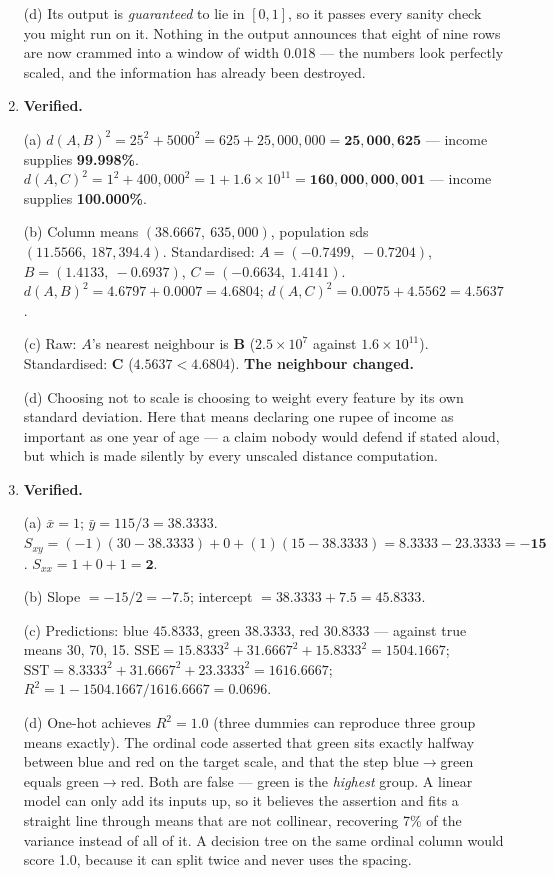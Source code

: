 \documentclass[11pt,a4paper]{article}
\newcommand{\A}[1]{\item[\textbf{#1}]}
\begin{document}
\begin{enumerate}[leftmargin=1.9cm]
\begin{answerbox}
(d) Its output is \emph{guaranteed} to lie in $[0,1]$, so it passes every sanity
check you might run on it. Nothing in the output announces that eight of nine
rows are now crammed into a window of width 0.018 --- the numbers look
perfectly scaled, and the information has already been destroyed.
\end{answerbox}

\A{U4.64} \textbf{Verified.}
\begin{answerbox}
(a) $d(A,B)^2 = 25^2 + 5000^2 = 625 + 25{,}000{,}000 = \mathbf{25{,}000{,}625}$
--- income supplies \textbf{99.998\%}.
$d(A,C)^2 = 1^2 + 400{,}000^2 = 1 + 1.6\times10^{11} =
\mathbf{160{,}000{,}000{,}001}$ --- income supplies \textbf{100.000\%}.

(b) Column means $(38.6667,\ 635{,}000)$, population sds
$(11.5566,\ 187{,}394.4)$. Standardised:
$A = (-0.7499,\ -0.7204)$, $B = (1.4133,\ -0.6937)$, $C = (-0.6634,\ 1.4141)$.
$d(A,B)^2 = 4.6797 + 0.0007 = \mathbf{4.6804}$;
$d(A,C)^2 = 0.0075 + 4.5562 = \mathbf{4.5637}$.

(c) Raw: $A$'s nearest neighbour is $\mathbf{B}$ ($2.5\times10^7$ against
$1.6\times10^{11}$). Standardised: $\mathbf{C}$ ($4.5637 < 4.6804$).
\textbf{The neighbour changed.}

(d) Choosing not to scale is choosing to weight every feature by its own
standard deviation. Here that means declaring one rupee of income as important
as one year of age --- a claim nobody would defend if stated aloud, but which is
made silently by every unscaled distance computation.
\end{answerbox}

\A{U4.65} \textbf{Verified.}
\begin{answerbox}
(a) $\bar x = 1$; $\bar y = 115/3 = \mathbf{38.3333}$.
$S_{xy} = (-1)(30-38.3333) + 0 + (1)(15-38.3333) = 8.3333 - 23.3333 =
\mathbf{-15}$. $S_{xx} = 1 + 0 + 1 = \mathbf{2}$.

(b) Slope $= -15/2 = \mathbf{-7.5}$;
intercept $= 38.3333 + 7.5 = \mathbf{45.8333}$.

(c) Predictions: blue $\mathbf{45.8333}$, green $\mathbf{38.3333}$,
red $\mathbf{30.8333}$ --- against true means 30, 70, 15.
$\text{SSE} = 15.8333^2 + 31.6667^2 + 15.8333^2 = \mathbf{1504.1667}$;
$\text{SST} = 8.3333^2 + 31.6667^2 + 23.3333^2 = \mathbf{1616.6667}$;
$R^2 = 1 - 1504.1667/1616.6667 = \mathbf{0.0696}$.

(d) One-hot achieves $R^2 = \mathbf{1.0}$ (three dummies can reproduce three
group means exactly). The ordinal code asserted that green sits exactly halfway
between blue and red on the target scale, and that the step blue$\to$green
equals green$\to$red. Both are false --- green is the \emph{highest} group.
A linear model can only add its inputs up, so it believes the assertion and
fits a straight line through means that are not collinear, recovering 7\% of
the variance instead of all of it. A decision tree on the same ordinal column
would score 1.0, because it can split twice and never uses the spacing.
\end{answerbox}


\end{enumerate}
\end{document}
